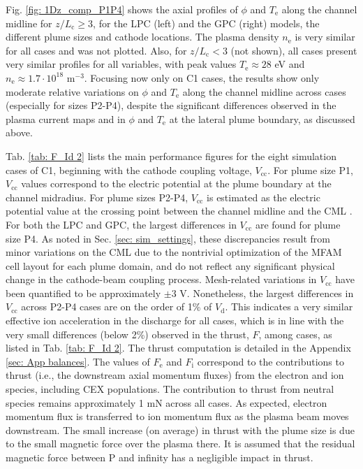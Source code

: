 \documentclass[%
 aip,
cha,
 amsmath,amssymb,
 reprint,%
]{revtex4-1}
\begin{document}
Fig. \ref{fig: 1Dz_comp_P1P4} shows the axial profiles of $\phi$ and $T_\mathrm{e}$ along the channel midline for $z/L_\mathrm{c} \geq 3$, for the LPC (left) and the GPC (right) models, the different plume sizes and cathode locations. The plasma density $n_\mathrm{e}$ is very similar for all cases and was not plotted. Also, for $z/L_\mathrm{c} < 3$ (not shown), all cases present very similar profiles for all variables, with peak values $T_\mathrm{e} \approx 28$ eV and $n_\mathrm{e} \approx 1.7\cdot 10^{18}$ m$^{-3}$. 
Focusing now only on C1 cases, the results show only moderate relative variations on $\phi$ and $T_\mathrm{e}$ along the channel midline across cases (especially for sizes P2-P4), despite the significant differences observed in the plasma current maps and in $\phi$ and $T_\mathrm{e}$ at the lateral plume boundary, as discussed above. 



Tab. \ref{tab: F_Id 2} lists the main performance figures for the eight simulation cases of C1, beginning with the cathode coupling voltage, $V_\mathrm{cc}$.
For plume size P1, $V_\mathrm{cc}$ values correspond to the electric potential at the plume boundary at the channel midradius.
For plume sizes P2-P4, $V_\mathrm{cc}$ is estimated as the electric potential value at the crossing point between the channel midline and the CML \cite{jorn21}.
For both the LPC and GPC, the largest differences in $V_\mathrm{cc}$ are found for plume size P4.
%
As noted in Sec. \ref{sec: sim_settings}, these discrepancies result from minor variations on the CML due to the nontrivial optimization of the MFAM cell layout for each plume domain, and do not reflect any significant physical change in the cathode-beam coupling process.
Mesh-related variations in $V_\mathrm{cc}$ have been quantified to be approximately $\pm 3$ V.
%
Nonetheless, the largest differences in $V_\mathrm{cc}$ across P2-P4 cases are on the order of 1\% of $V_\mathrm{d}$.
This indicates a very similar effective ion acceleration in the discharge for all cases,
%
which is in line with the very small differences (below 2\%) observed in the thrust, $F$, among cases, as listed in Tab. \ref{tab: F_Id 2}. The thrust computation is detailed in the Appendix \ref{sec: App balances}. The values of $F_\mathrm{e}$ and $F_\mathrm{i}$ correspond to the contributions to thrust (i.e., the downstream axial momentum fluxes) from the electron and ion species, including CEX populations. The contribution to thrust from neutral species remains approximately 1 mN across all cases. As expected, electron momentum flux is transferred to ion momentum flux as the plasma beam moves downstream. The small increase (on average) in thrust with the plume size is due to the small magnetic force over the plasma there. It is assumed that the residual magnetic force between P and infinity has a negligible impact in thrust. 
\end{document}
